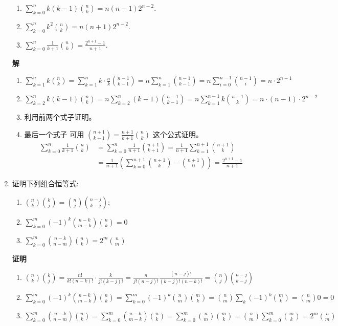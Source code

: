 \documentclass[a4paper,12pt]{ctexart}
\begin{document}
\begin{enumerate}
\begin{enumerate}
 \item  $\sum_{k=0}^{n} k(k-1)  \binom{n}{k}  =n(n-1) 2^{n-2}$.

 \item  $\sum_{k=0}^{n} k^{2}  \binom{n}{k}    =n(n+1) 2^{n-2}$.

  \item $\sum_{k=0}^{n} \frac{1}{k+1} \binom{n}{k}   =\frac{2^{n+1}-1}{n+1}.$
\end{enumerate}

 \textbf{解}\quad
\begin{enumerate}
	\item  $ \sum_{k=1}^{n} k \binom{n}{k}
	=\sum_{k=1}^{n} k \cdot \frac{n}{k}\binom{n-1}{k-1}
	=n \sum_{k=1}^{n} \binom{n-1}{k-1}
	=n \sum_{i=0}^{n-1} \binom{n-1}{i}=n \cdot 2^{n-1}$

 \item
 $\sum_{k=2}^{n} k(k-1) \binom{n}{k}
 =n \sum_{k=2}^{n}(k-1)  \binom{n-1}{k-1}
 =n \sum_{k=1}^{n-1} k  \binom{n-1}{k}
 =n \cdot(n-1) \cdot 2^{n-2}$

  \item  利用前两个式子证明。
   \item  最后一个式子
可用 $\binom{n+1}{k+1}=\frac{n+1}{k+1}\binom{n}{k}$ 这个公式证明。
$$
\begin{aligned}
	\sum_{k=0}^{n} \frac{1}{k+1}\binom{n}{k}&=\sum_{k=0}^{n} \frac{1}{n+1}\binom{n+1}{k+1}=\frac{1}{n+1} \sum_{k=1}^{n+1}\binom{n+1}{k}\\
	&=\frac{1}{n+1}\left(\sum_{k=0}^{n+1}\binom{n+1}{k} -\binom{n+1}{0}\right)=\frac{2^{n+1}-1}{n+1}
\end{aligned}
$$
\end{enumerate}



\item
证明下列组合恒等式:
\begin{enumerate}
	\item $\binom{n}{k}\binom{k}{j}=\binom{n}{j} \binom{n-j}{k-j}$;
	\item  $\sum_{k=0}^{m}(-1)^{k}\binom{n-k}{m-k} \binom{n}{k}=0$
	\item  $\sum_{k=0}^{m}\binom{n-k}{n-m}  \binom{n}{k}=2^{m}\binom{n}{m}$
\end{enumerate}


\textbf{ 证明 } \quad
\begin{enumerate}
	\item
	$\binom{n}{k}\binom{k}{j}=\frac{n !}{k! (n-k) !} \cdot \frac{k}{j!(k-j) !}=\frac{n}{j!(n-j) !}\frac{(n-j) !}{ (k-j) !(n-k) !}=\binom{n}{j} \binom{n-j}{k-j}$
	\item
	$
	\sum_{k=0}^{m}(-1)^{k}\binom{n-k}{m-k} \binom{n}{k}
	= \sum_{k=0}^{m}(-1)^{k}\binom{n}{m}\binom{m}{k}
	= \binom{n}{m} \sum_{k}(-1)^{k}\binom{m}{k}
	= \binom{n}{m} 0=0
	$
	\item
	$\sum_{k=0}^{m}\binom{n-k}{n-m} \binom{n}{k}
	=\sum_{k=0}^{m}\binom{n-k}{m-k}\binom{n}{k}
	=\sum_{k=0}^{m}\binom{n} {m}\binom{m}{k}
	=\binom{n}{ m}\sum_{k=0}^{m}\binom{m}{k}=2^{m}\binom{n}{m}$
\end{enumerate}
\end{enumerate}
\end{document}
